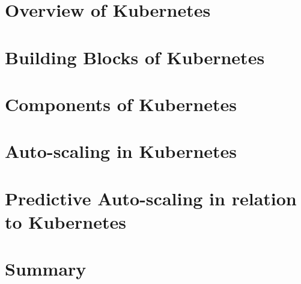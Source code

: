 \section{Overview of Kubernetes}



\section{Building Blocks of Kubernetes}



\section{Components of Kubernetes}



\section{Auto-scaling in Kubernetes}

\label{architecture-autoscaling-in-kubernetes}


\section{Predictive Auto-scaling in relation to Kubernetes}



\section{Summary}



